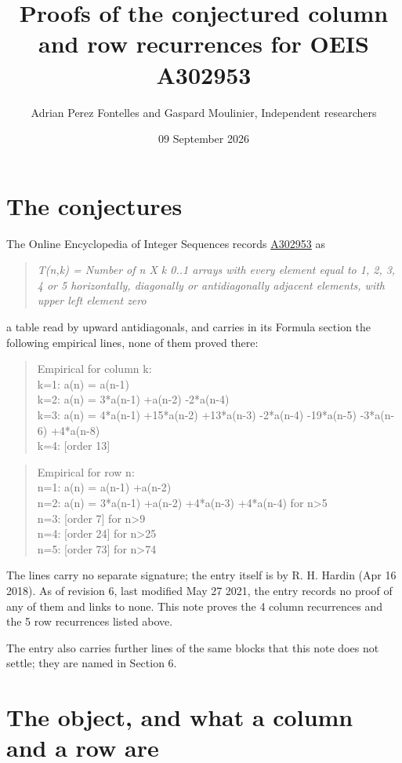 \documentclass[11pt]{article}
\title{Proofs of the conjectured column and row recurrences for OEIS A302953}
\author{Adrian Perez Fontelles and Gaspard Moulinier, Independent researchers}
\date{09 September 2026}
\theoremstyle{definition}
\begin{document}
\maketitle
\section{The conjectures}

The Online Encyclopedia of Integer Sequences records \href{https://oeis.org/A302953}{A302953} as

\begin{quote}\itshape T(n,k) = Number of n X k 0..1 arrays with every element equal to 1, 2, 3, 4 or 5 horizontally, diagonally or antidiagonally adjacent elements, with upper left element zero\end{quote}

a table read by upward antidiagonals, and carries in its Formula section the following empirical lines, none of them proved there:

\begin{quote}\ttfamily Empirical for column k:\\
k=1: a(n) = a(n-1)\\k=2: a(n) = 3*a(n-1) +a(n-2) -2*a(n-4)\\k=3: a(n) = 4*a(n-1) +15*a(n-2) +13*a(n-3) -2*a(n-4) -19*a(n-5) -3*a(n-6) +4*a(n-8)\\k=4: [order 13]\end{quote}

\begin{quote}\ttfamily Empirical for row n:\\
n=1: a(n) = a(n-1) +a(n-2)\\n=2: a(n) = 3*a(n-1) +a(n-2) +4*a(n-3) +4*a(n-4) for n>5\\n=3: [order 7] for n>9\\n=4: [order 24] for n>25\\n=5: [order 73] for n>74\end{quote}

The lines carry no separate signature; the entry itself is by R. H. Hardin (Apr 16 2018). As of revision 6, last modified May 27 2021, the entry records no proof of any of them and links to none. This note proves the 4 column recurrences and the 5 row recurrences listed above.

The entry also carries further lines of the same blocks that this note does not settle; they are named in Section 6.

\section{The object, and what a column and a row are}
\end{document}
